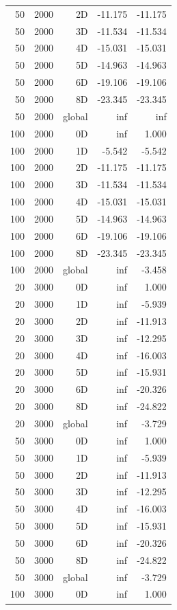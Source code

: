 \begin{longtable}{rrrrr}
50 & 2000 & 2D & -11.175 & -11.175 \\
50 & 2000 & 3D & -11.534 & -11.534 \\
50 & 2000 & 4D & -15.031 & -15.031 \\
50 & 2000 & 5D & -14.963 & -14.963 \\
50 & 2000 & 6D & -19.106 & -19.106 \\
50 & 2000 & 8D & -23.345 & -23.345 \\
50 & 2000 & global & inf & inf \\
100 & 2000 & 0D & inf & 1.000 \\
100 & 2000 & 1D & -5.542 & -5.542 \\
100 & 2000 & 2D & -11.175 & -11.175 \\
100 & 2000 & 3D & -11.534 & -11.534 \\
100 & 2000 & 4D & -15.031 & -15.031 \\
100 & 2000 & 5D & -14.963 & -14.963 \\
100 & 2000 & 6D & -19.106 & -19.106 \\
100 & 2000 & 8D & -23.345 & -23.345 \\
100 & 2000 & global & inf & -3.458 \\
20 & 3000 & 0D & inf & 1.000 \\
20 & 3000 & 1D & inf & -5.939 \\
20 & 3000 & 2D & inf & -11.913 \\
20 & 3000 & 3D & inf & -12.295 \\
20 & 3000 & 4D & inf & -16.003 \\
20 & 3000 & 5D & inf & -15.931 \\
20 & 3000 & 6D & inf & -20.326 \\
20 & 3000 & 8D & inf & -24.822 \\
20 & 3000 & global & inf & -3.729 \\
50 & 3000 & 0D & inf & 1.000 \\
50 & 3000 & 1D & inf & -5.939 \\
50 & 3000 & 2D & inf & -11.913 \\
50 & 3000 & 3D & inf & -12.295 \\
50 & 3000 & 4D & inf & -16.003 \\
50 & 3000 & 5D & inf & -15.931 \\
50 & 3000 & 6D & inf & -20.326 \\
50 & 3000 & 8D & inf & -24.822 \\
50 & 3000 & global & inf & -3.729 \\
100 & 3000 & 0D & inf & 1.000 \\

\end{longtable}
